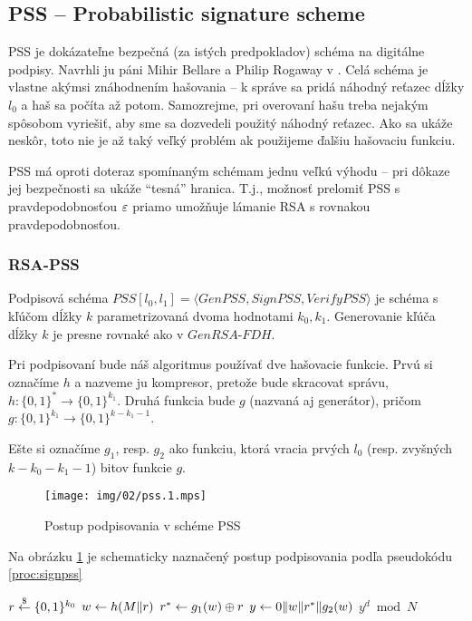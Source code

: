 \subsection{PSS -- Probabilistic signature scheme}

PSS je dokázateľne bezpečná (za istých predpokladov) schéma na
digitálne podpisy. Navrhli ju páni Mihir Bellare a Philip Rogaway
v \cite{pss}. Celá schéma je vlastne akýmsi znáhodnením hašovania -- k
správe sa pridá náhodný reťazec dĺžky $l_0$ a haš sa počíta až
potom. Samozrejme, pri overovaní hašu treba nejakým spôsobom
vyriešiť, aby sme sa dozvedeli použitý náhodný reťazec. Ako sa ukáže
neskôr, toto nie je až taký veľký problém ak použijeme ďalšiu
hašovaciu funkciu.

PSS má oproti doteraz spomínaným schémam jednu veľkú výhodu -- pri
dôkaze jej bezpečnosti sa ukáže ``tesná'' hranica. T.j., možnosť
prelomiť PSS s pravdepodobnosťou $\varepsilon$ priamo umožňuje lámanie RSA s
rovnakou pravdepodobnosťou.


\subsubsection{RSA-PSS}

Podpisová schéma $PSS[l_0,l_1]=\langle GenPSS,SignPSS,VerifyPSS\rangle$ je
schéma s kľúčom dĺžky $k$ parametrizovaná dvoma hodnotami $k_0, k_1$.
Generovanie kľúča dĺžky $k$ je presne rovnaké ako v $GenRSA\mbox{-}FDH$.

Pri podpisovaní bude náš algoritmus používať dve hašovacie funkcie.
Prvú si označíme $h$ a nazveme ju kompresor, pretože bude skracovat
správu, $h:\{0,1\}^* \rightarrow \{0,1\}^{k_1}$.
Druhá funkcia bude $g$ (nazvaná aj generátor), pričom
$g:\{0,1\}^{k_1} \rightarrow \{0,1\}^{k-k_1-1}$.

Ešte si označíme $g_1$, resp. $g_2$ ako funkciu, ktorá vracia
prvých $l_0$ (resp. zvyšných $k-k_0-k_1-1$) bitov funkcie $g$.

\begin{figure}[h]
    \centering
    \texttt{[image: img/02/pss.1.mps]}
    \caption{Postup podpisovania v schéme PSS}
    \label{fig:pss}

\end{figure}
Na obrázku \ref{fig:pss} je schematicky naznačený postup podpisovania
podľa pseudokódu \ref{proc:signpss}

\begin{procedure}
    \caption{SignPSS($m$)}
    \label{proc:signpss}
    $r \overset{\$}{\leftarrow} \{0,1\}^{k_0}$\;
    $w \leftarrow h(M \| r)$\;
    $r^* \leftarrow g_1(w) \oplus r$\;
    $y \leftarrow 0 \| w \| r^* \| g_2(w)$\;
    \Return $y^d \bmod N$\;
\end{procedure}

